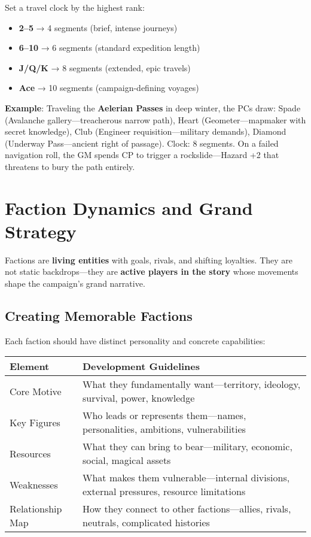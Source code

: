 Set a travel clock by the highest rank:
\begin{itemize}
    \item \textbf{2--5} → 4 segments (brief, intense journeys)
    \item \textbf{6--10} → 6 segments (standard expedition length)
    \item \textbf{J/Q/K} → 8 segments (extended, epic travels)
    \item \textbf{Ace} → 10 segments (campaign-defining voyages)
\end{itemize}

\textbf{Example}: Traveling the \textbf{Aelerian Passes} in deep winter, the PCs draw: Spade (Avalanche gallery—treacherous narrow path), Heart (Geometer—mapmaker with secret knowledge), Club (Engineer requisition—military demands), Diamond (Underway Pass—ancient right of passage). Clock: 8 segments. On a failed navigation roll, the GM spends CP to trigger a rockslide—Hazard +2 that threatens to bury the path entirely.

\section*{Faction Dynamics and Grand Strategy}

Factions are \textbf{living entities} with goals, rivals, and shifting loyalties. They are not static backdrops---they are \textbf{active players in the story} whose movements shape the campaign's grand narrative.

\subsection*{Creating Memorable Factions}

Each faction should have distinct personality and concrete capabilities:

\begin{fatebox}
\begin{tabularx}{\textwidth}{lX}
\toprule
\textbf{Element} & \textbf{Development Guidelines} \\
\midrule
Core Motive & What they fundamentally want—territory, ideology, survival, power, knowledge \\
Key Figures & Who leads or represents them—names, personalities, ambitions, vulnerabilities \\
Resources & What they can bring to bear—military, economic, social, magical assets \\
Weaknesses & What makes them vulnerable—internal divisions, external pressures, resource limitations \\
Relationship Map & How they connect to other factions—allies, rivals, neutrals, complicated histories \\
\bottomrule
\end{tabularx}
\end{fatebox}

